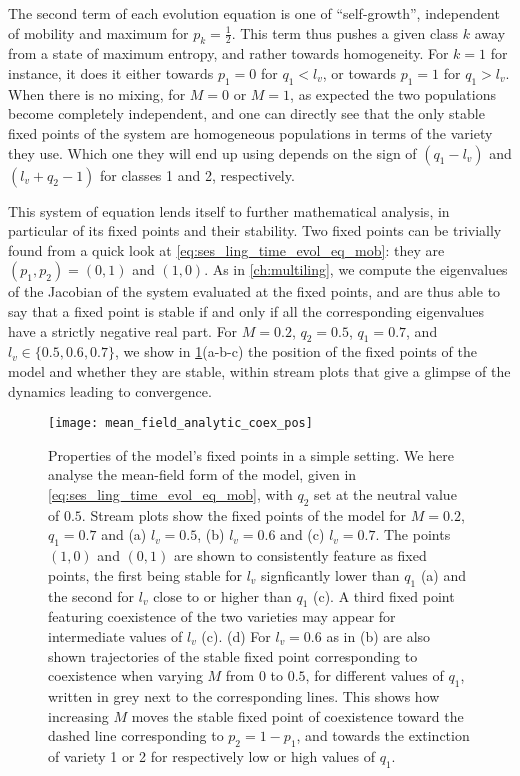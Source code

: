 \documentclass[../thesis.tex]{subfiles}
\begin{document}
The second term of each evolution equation is one of ``self-growth'', independent of
mobility and maximum for $p_k = \frac{1}{2}$. This term thus pushes a given class $k$
away from a state of maximum entropy, and rather towards homogeneity. For $k = 1$ for
instance, it does it either towards $p_1 = 0$ for $q_1 < l_v$, or towards $p_1 = 1$ for
$q_1 > l_v$. When there is no mixing, for $M = 0$ or $M = 1$, as expected the two
populations become completely independent, and one can directly see that the only stable
fixed points of the system are homogeneous populations in terms of the variety they use.
Which one they will end up using depends on the sign of $(q_1 - l_v)$ and $(l_v + q_2 -
1)$ for classes 1 and 2, respectively.

This system of equation lends itself to further mathematical analysis, in particular of its
fixed points and their stability. Two fixed points can be trivially found from a quick
look at \cref{eq:ses_ling_time_evol_eq_mob}: they are $(p_1, p_2) = (0, 1)$ and $(1,
0)$. As in \cref{ch:multiling}, we compute the eigenvalues of the Jacobian of the system
evaluated at the fixed points, and are thus able to say that a fixed point is stable if
and only if all the corresponding eigenvalues have a strictly negative real part. For $M
= 0.2$, $q_2= 0.5$, $q_1 = 0.7$, and $l_v \in \{ 0.5, 0.6, 0.7\}$, we show in
\cref{fig:mean_field_analytic_coex_pos}(a-b-c) the position of the fixed points of the
model and whether they are stable, within stream plots that give a glimpse of the
dynamics leading to convergence.
\begin{figure}
\centering
  \texttt{[image: mean\_field\_analytic\_coex\_pos]}
  \caption{Properties of the model's fixed points in a simple setting. We here analyse
  the mean-field form of the model, given in \cref{eq:ses_ling_time_evol_eq_mob}, with
  $q_2$ set at the neutral value of $0.5$. Stream plots show the fixed points of the
  model for $M = 0.2$, $q_1 = 0.7$ and (a) $l_v = 0.5$, (b) $l_v = 0.6$ and (c) $l_v =
  0.7$. The points $(1, 0)$ and $(0, 1)$ are shown to consistently feature as fixed
  points, the first being stable for $l_v$ signficantly lower than $q_1$ (a) and the
  second for $l_v$ close to or higher than $q_1$ (c). A third fixed point featuring
  coexistence of the two varieties may appear for intermediate values of $l_v$ (c). (d)
  For $l_v = 0.6$ as in (b) are also shown trajectories of the stable fixed point
  corresponding to coexistence when varying $M$ from $0$ to $0.5$, for different values
  of $q_1$, written in grey next to the corresponding lines. This shows how increasing
  $M$ moves the stable fixed point of coexistence toward the dashed line corresponding
  to $p_2 = 1 - p_1$, and towards the extinction of variety 1 or 2 for respectively low
  or high values of $q_1$.}
  \label{fig:mean_field_analytic_coex_pos}
\end{figure}
\end{document}

